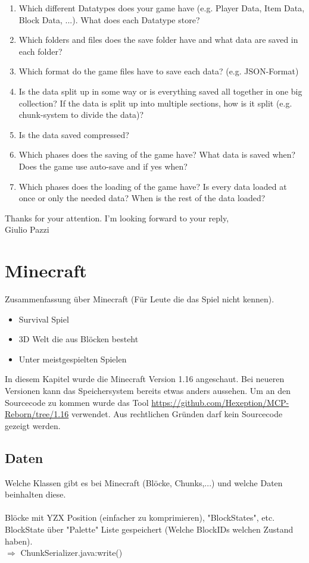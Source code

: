 \begin{enumerate}
    \item Which different Datatypes does your game have (e.g. Player Data, Item Data, Block Data, ...). What does each Datatype store?
    \item Which folders and files does the save folder have and what data are saved in each folder?
    \item Which format do the game files have to save each data? (e.g. JSON-Format)
    \item Is the data split up in some way or is everything saved all together in one big collection? If the data is split up into multiple sections, how is it split (e.g. chunk-system to divide the data)?
    \item Is the data saved compressed? 
    \item Which phases does the saving of the game have? What data is saved when? Does the game use auto-save and if yes when?
    \item Which phases does the loading of the game have? Is every data loaded at once or only the needed data? When is the rest of the data loaded?
\end{enumerate}

Thanks for your attention. I’m looking forward to your reply,\\
Giulio Pazzi
\fi


\section{Minecraft}
Zusammenfassung über Minecraft (Für Leute die das Spiel nicht kennen).
\begin{itemize}
    \item Survival Spiel
    \item 3D Welt die aus Blöcken besteht
    \item Unter meistgespielten Spielen
\end{itemize}

In diesem Kapitel wurde die Minecraft Version 1.16 angeschaut. 
Bei neueren Versionen kann das Speichersystem bereits etwas anders aussehen. Um an den Sourcecode zu kommen wurde das Tool 
\url{https://github.com/Hexeption/MCP-Reborn/tree/1.16} verwendet. Aus rechtlichen Gründen darf kein
Sourcecode gezeigt werden.

\subsection{Daten}
Welche Klassen gibt es bei Minecraft (Blöcke, Chunks,...) und welche Daten 
beinhalten diese.\\
\\
Blöcke mit YZX Position (einfacher zu komprimieren), "BlockStates", etc.\\
BlockState über "Palette" Liste gespeichert (Welche BlockIDs welchen Zustand haben).\\
$\Rightarrow{}$ ChunkSerializer.java:write()\\


